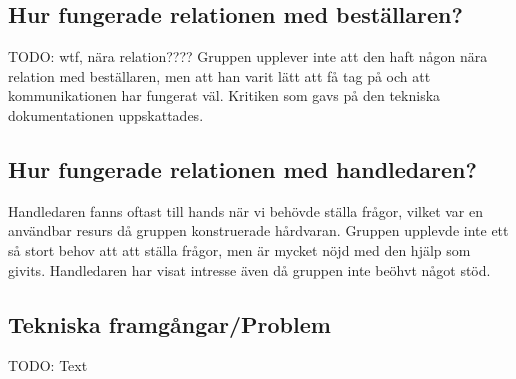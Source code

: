 \documentclass{article}
\begin{document}
\subsection{Hur fungerade relationen med beställaren?}
TODO: wtf, nära relation????
Gruppen upplever inte att den haft någon nära relation med beställaren, men att han varit lätt att få tag på och att kommunikationen har fungerat väl. Kritiken som gavs på den tekniska dokumentationen uppskattades. 

\subsection{Hur fungerade relationen med handledaren?}
Handledaren fanns oftast till hands när vi behövde ställa frågor, vilket var en användbar resurs då gruppen konstruerade hårdvaran. Gruppen upplevde inte ett så stort behov att att ställa frågor, men är mycket nöjd med den hjälp som givits. Handledaren har visat intresse även då gruppen inte beöhvt något stöd.

\subsection{Tekniska framgångar/Problem}
TODO: Text
\end{document}
